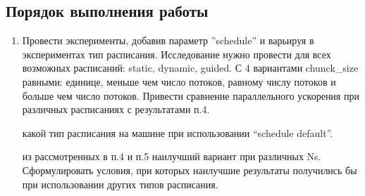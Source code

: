 \subsection{Порядок выполнения работы}
\begin{enumerate}
     во все for-циклы (кроме цикла в функции main, указывающего количество экспериментов) в программе из ЛР №1 следующую директиву OpenMP:
    Наличие параметра default(none) является обязательным.
    
     все for-циклы на внутренние зависимости по данным между итерациями. Если зависимости обнаружились, использовать для защиты критических секций директиву ``\#pragma omp critical'' или ``\#pragma omp atomic'' (если операция атомарна), или параметр reduction (предпочтительнее) или вообще отказаться от распараллеливания цикла (свой выбор необходимо обосновать).
    
    , что получившаяся программа обладает свойством прямой совместимости с компиляторами, не поддерживающими \\OpenMP (для проверки этого можно скомпилировать программу без опции ``–fopenmp'', в результате не должно быть сообщений об ошибках, а программа должна корректно работать).
    
     функцию SetNumThreads для изменения числа потоков. В отчете указать максимальное количество потоков.
    
     эксперименты, замеряя параллельное ускорение. Привести сравнение графиков параллельного ускорения с ЛР №1 и ЛР №2.
    
    \item Провести эксперименты, добавив параметр ''schedule'' и варьируя в экспериментах тип расписания. Исследование нужно провести для всех возможных расписаний: static, dynamic, guided. С 4 вариантами chunck\_size равными: единице, меньше чем число потоков, равному числу потоков и больше чем число потоков. Привести сравнение параллельного ускорения при различных расписаниях с результатами п.4.
    
     какой тип расписания на машине при использовании ``schedule default''.
    
     из рассмотренных в п.4 и п.5 наилучший вариант при различных Ns. Сформулировать условия, при которых наилучшие результаты получились бы при использовании других типов расписания.
    

\end{enumerate}
